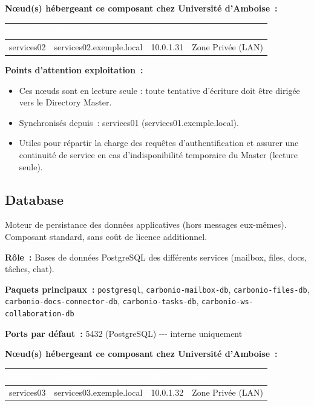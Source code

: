 \documentclass[11pt,a4paper]{report}
\newcommand{\tblhead}[1]{\textcolor{white}{\textbf{#1}}}
\begin{document}
\textbf{Nœud(s) hébergeant ce composant chez Université d'Amboise~:}
\begin{longtable}{|p{3.2cm}|p{4.5cm}|p{3.2cm}|p{2.3cm}|}
\hline
\rowcolor{primary}\tblhead{Nœud} & \tblhead{Hostname} & \tblhead{IP} & \tblhead{Zone} \\
\hline
\endhead
services02 & services02.\allowbreak{}exemple.\allowbreak{}local & 10.\allowbreak{}0.\allowbreak{}1.\allowbreak{}31 & Zone Privée (LAN) \\
\hline
\end{longtable}

\textbf{Points d'attention exploitation~:}
\begin{itemize}[nosep]
  \item Ces nœuds sont en lecture seule : toute tentative d'écriture doit être dirigée vers le Directory Master.
  \item Synchronisés depuis~: services01 (services01.\allowbreak{}exemple.\allowbreak{}local).
  \item Utiles pour répartir la charge des requêtes d'authentification et assurer une continuité de service en cas d'indisponibilité temporaire du Master (lecture seule).
\end{itemize}

\subsection{Database}

Moteur de persistance des données applicatives (hors messages eux-\allowbreak{}mêmes).\allowbreak{} Composant standard, sans coût de licence additionnel.\allowbreak{}

\textbf{Rôle~:} Bases de données PostgreSQL des différents services (mailbox, files, docs, tâches, chat).\allowbreak{}

\textbf{Paquets principaux~:} \texttt{postgresql}, \texttt{carbonio-\allowbreak{}mailbox-\allowbreak{}db}, \texttt{carbonio-\allowbreak{}files-\allowbreak{}db}, \texttt{carbonio-\allowbreak{}docs-\allowbreak{}connector-\allowbreak{}db}, \texttt{carbonio-\allowbreak{}tasks-\allowbreak{}db}, \texttt{carbonio-\allowbreak{}ws-\allowbreak{}collaboration-\allowbreak{}db}

\textbf{Ports par défaut~:} 5432 (PostgreSQL) -\allowbreak{}-\allowbreak{}-\allowbreak{} interne uniquement

\textbf{Nœud(s) hébergeant ce composant chez Université d'Amboise~:}
\begin{longtable}{|p{3.2cm}|p{4.5cm}|p{3.2cm}|p{2.3cm}|}
\hline
\rowcolor{primary}\tblhead{Nœud} & \tblhead{Hostname} & \tblhead{IP} & \tblhead{Zone} \\
\hline
\endhead
services03 & services03.\allowbreak{}exemple.\allowbreak{}local & 10.\allowbreak{}0.\allowbreak{}1.\allowbreak{}32 & Zone Privée (LAN) \\
\hline
\end{longtable}
\end{document}
